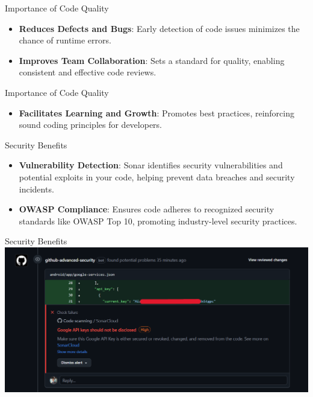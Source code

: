 \documentclass{beamer}
\begin{document}
\begin{frame}{Importance of Code Quality}
  \begin{itemize}
    \item \textbf{Reduces Defects and Bugs}: Early detection of code issues minimizes the chance of runtime errors.
    \item \textbf{Improves Team Collaboration}: Sets a standard for quality, enabling consistent and effective code reviews.
  \end{itemize}
\end{frame}

\begin{frame}{Importance of Code Quality}
  \begin{itemize}
    \item \textbf{Facilitates Learning and Growth}: Promotes best practices, reinforcing sound coding principles for developers.
  \end{itemize}
\end{frame}


\begin{frame}{Security Benefits}
  \begin{itemize}
    \item \textbf{Vulnerability Detection}: Sonar identifies security vulnerabilities and potential exploits in your code, helping prevent data breaches and security incidents.
    \item \textbf{OWASP Compliance}: Ensures code adheres to recognized security standards like OWASP Top 10, promoting industry-level security practices.
  \end{itemize}
\end{frame}

\begin{frame}{Security Benefits}
  \includegraphics[width=1\textwidth]{fig/api-security-1.PNG}
\end{frame}
\end{document}

